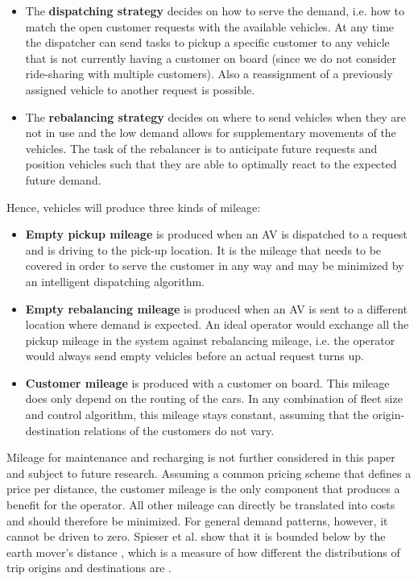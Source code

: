 \begin{itemize}
\item The \textbf{dispatching strategy} decides on how to serve the demand, i.e.
how to match the open customer requests with the available vehicles. At any time the dispatcher can send tasks to pickup a specific customer to any vehicle that is not currently having a customer on board (since we do not consider ride-sharing with multiple customers). Also a reassignment of a previously assigned
vehicle to another request is possible.
\item The \textbf{rebalancing strategy} decides on where to send vehicles when they
are not in use and the low demand allows for supplementary movements of the vehicles.
The task of the rebalancer is to anticipate future requests and position vehicles
such that they are able to optimally react to the expected future demand.
\end{itemize}

Hence, vehicles will produce three kinds of mileage:

\begin{itemize}
\item \textbf{Empty pickup mileage} is produced when an AV is dispatched
to a request and is driving to the pick-up location. It is the mileage that needs
to be covered in order to serve the customer in any way and may be minimized
by an intelligent dispatching algorithm.
\item \textbf{Empty rebalancing mileage} is produced when an AV is sent
to a different location where demand is expected. An ideal operator would
exchange all the pickup mileage in the system against rebalancing mileage, i.e. the operator would always send empty vehicles before an actual request turns up.
\item \textbf{Customer mileage} is produced with a customer on board. This mileage does only depend on the routing of the cars. In any combination of fleet size and
control algorithm, this mileage stays constant, assuming that the origin-destination relations of the customers do not vary.
\end{itemize}

Mileage for maintenance and recharging is not further considered in this paper and subject to future research.
Assuming a common pricing scheme that defines a price per distance, the customer mileage
is the only component that produces a benefit for the operator. All other mileage
can directly be translated into costs and should therefore be minimized. For general
demand patterns, however, it cannot be driven to zero. Spieser et al. \cite{spieser2014toward}
show that it is bounded below by the earth mover's distance \cite{levina2001earth}, which is a measure
of how different the distributions of trip origins and destinations are \cite{ruschendorf1985wasserstein}.

